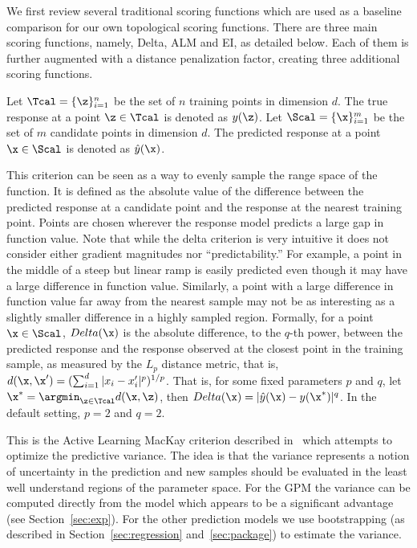 We first review several traditional scoring functions which are used as a baseline comparison for our own topological scoring functions.
%
There are three main scoring functions, namely, Delta, ALM and EI, as detailed below.
%
Each of them is further augmented with a distance penalization factor, creating three additional scoring functions.

Let $\Tcal = \{\z\}_{i=1}^{n}$ be the set of $n$ training points in dimension $d$.
%
The true response at a point $\z \in \Tcal$ is denoted as $y(\z)$.
%
Let $\Scal = \{\x\}_{i=1}^{m}$ be the set of $m$ candidate points in dimension $d$.
%
The predicted response at a point $\x \in \Scal$ is denoted as $\hat{y}(\x)$.

 This criterion can be seen as a way to evenly sample the range space of the function.
%
It is defined as the absolute value of the difference between the predicted response at a candidate point and the response at the nearest training point.
%
Points are chosen wherever the response model predicts a large gap in function value.
%
Note that while the delta criterion is very intuitive it does not consider either gradient magnitudes nor ``predictability.''
%
For example, a point in the middle of a steep but linear ramp is easily predicted even though it may have a large difference in function value.
%
Similarly, a point with a large difference in function value far away from the nearest sample may not be as interesting as a slightly smaller difference in a highly sampled region.
%
Formally, for a point $\x \in \Scal$, $Delta(\x)$ is the absolute difference, to the $q$-th power, between the predicted response and the response observed at the closest point in the training sample, as measured by the $L_p$ distance metric, that is, $d(\x,\x') = (\sum_{i=1}^{d}|x_i-x'_i|^p)^{1/p}$.
%
That is, for some fixed parameters $p$ and $q$, let $\x^* = \argmin_{\z \in \Tcal} d(\x,\z)$, then $Delta(\x) = |\hat{y}(\x) - y(\x^*)|^q$.
%
In the default setting, $p = 2$ and $q = 2$.

 This is the Active Learning MacKay criterion described in~\cite{MacKay1992} which attempts to optimize the predictive variance.
%
The idea is that the variance represents a notion of uncertainty in the prediction and new samples should be evaluated in the least well understand regions of the parameter space.
%
For the GPM the variance can be computed directly from the model which appears to be a significant advantage (see Section~\ref{sec:exp}).
%
For the other prediction models we use bootstrapping (as described in Section~\ref{sec:regression} and~\ref{sec:package}) to estimate the variance.


